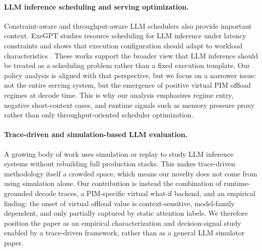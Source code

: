 \paragraph{LLM inference scheduling and serving optimization.}
Constraint-aware and throughput-aware LLM schedulers also provide important context. ExeGPT studies resource scheduling for LLM inference under latency constraints and shows that execution configuration should adapt to workload characteristics \citep{oh2024exegpt}. These works support the broader view that LLM inference should be treated as a scheduling problem rather than a fixed execution template. Our policy analysis is aligned with that perspective, but we focus on a narrower issue: not the entire serving system, but the emergence of positive virtual PIM offload regimes at decode time. This is why our analysis emphasizes regime entry, negative short-context cases, and runtime signals such as memory pressure proxy rather than only throughput-oriented scheduler optimization.

\paragraph{Trace-driven and simulation-based LLM evaluation.}
A growing body of work uses simulation or replay to study LLM inference systems without rebuilding full production stacks. This makes trace-driven methodology itself a crowded space, which means our novelty does not come from using simulation alone. Our contribution is instead the combination of runtime-grounded decode traces, a PIM-specific virtual what-if backend, and an empirical finding: the onset of virtual offload value is context-sensitive, model-family dependent, and only partially captured by static attention labels. We therefore position the paper as an empirical characterization and decision-signal study enabled by a trace-driven framework, rather than as a general LLM simulator paper.

